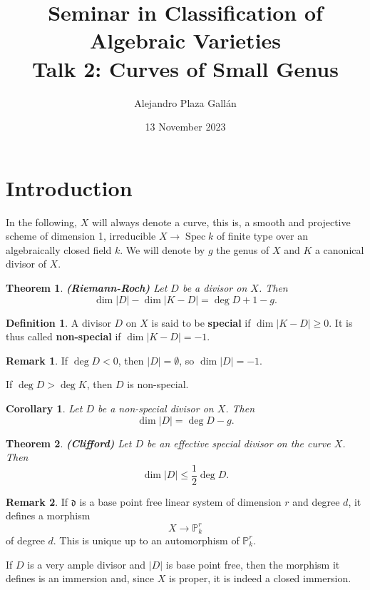 \documentclass[12pt]{article}
\title{\Huge{Seminar in Classification of Algebraic Varieties}\\\vspace{5mm}\Large{Talk 2: Curves of Small Genus}}
\author{Alejandro Plaza Gall\'{a}n}
\date{13 November 2023}
\newtheorem*{theorem}{Theorem}
\newtheorem*{corollary}{Corollary}
\theoremstyle{definition}
\newtheorem*{definition}{Definition}
\newtheorem*{remark}{Remark}
\DeclareMathOperator{\Spec}{Spec}
\begin{document}
\maketitle
\section{Introduction}

In the following, $X$ will always denote a curve, this is, a smooth and projective scheme of dimension 1, irreducible $X\rightarrow\Spec k$ of finite type over an algebraically closed field $k$. We will denote by $g$ the genus of $X$ and $K$ a canonical divisor of $X$.

\begin{theorem}
\textbf{\emph{(Riemann-Roch)}} Let $D$ be a divisor on $X$. Then
\[\dim|D|-\dim|K-D|=\deg D+1-g.\]
\end{theorem}

\begin{definition}
A divisor $D$ on $X$ is said to be \textbf{special} if $\dim|K-D|\geq0$. It is thus called \textbf{non-special} if $\dim|K-D|=-1$.
\end{definition}

\begin{remark}
If $\deg D<0$, then $|D|=\emptyset$, so $\dim|D|=-1$.

If $\deg D>\deg K$, then $D$ is non-special.
\end{remark}

\begin{corollary}
Let $D$ be a non-special divisor on $X$. Then
\[\dim|D|=\deg D-g.\]
\end{corollary}

\begin{theorem}
\emph{\textbf{(Clifford)}} Let $D$ be an effective special divisor on the curve $X$. Then
\[\dim|D|\leq\frac{1}{2}\deg D.\]
\end{theorem}

\begin{remark}
If $\mathfrak{d}$ is a base point free linear system of dimension $r$ and degree $d$, it defines a morphism
\[X\longrightarrow\mathbb{P}_k^r\]
of degree $d$. This is unique up to an automorphism of $\mathbb{P}_k^r$.

If $D$ is a very ample divisor and $|D|$ is base point free, then the morphism it defines is an immersion and, since $X$ is proper, it is indeed a closed immersion.
\end{remark}
\end{document}
